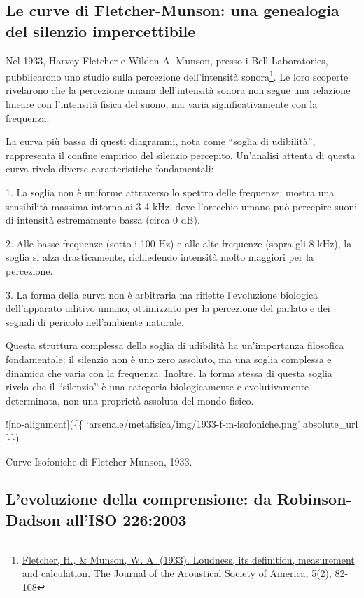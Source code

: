 \documentclass{gs-adonis}
\begin{document}
\subsection{Le curve di Fletcher-Munson: una genealogia del silenzio
impercettibile}\label{le-curve-di-fletcher-munson-una-genealogia-del-silenzio-impercettibile}

Nel 1933, Harvey Fletcher e Wilden A. Munson, presso i Bell
Laboratories, pubblicarono uno studio sulla percezione dell'intensità
sonora\footnote{\href{https://doi.org/10.1121/1.1915893}{Fletcher, H.,
  \& Munson, W. A. (1933). Loudness, its definition, measurement and
  calculation. The Journal of the Acoustical Society of America, 5(2),
  82-108}}. Le loro scoperte rivelarono che la percezione umana
dell'intensità sonora non segue una relazione lineare con l'intensità
fisica del suono, ma varia significativamente con la frequenza.

La curva più bassa di questi diagrammi, nota come ``soglia di
udibilità'', rappresenta il confine empirico del silenzio percepito.
Un'analisi attenta di questa curva rivela diverse caratteristiche
fondamentali:

1. La soglia non è uniforme attraverso lo spettro delle frequenze:
mostra una sensibilità massima intorno ai 3-4 kHz, dove l'orecchio umano
può percepire suoni di intensità estremamente bassa (circa 0 dB).

2. Alle basse frequenze (sotto i 100 Hz) e alle alte frequenze (sopra
gli 8 kHz), la soglia si alza drasticamente, richiedendo intensità molto
maggiori per la percezione.

3. La forma della curva non è arbitraria ma riflette l'evoluzione
biologica dell'apparato uditivo umano, ottimizzato per la percezione del
parlato e dei segnali di pericolo nell'ambiente naturale.

Questa struttura complessa della soglia di udibilità ha un'importanza
filosofica fondamentale: il silenzio non è uno zero assoluto, ma una
soglia complessa e dinamica che varia con la frequenza. Inoltre, la
forma stessa di questa soglia rivela che il ``silenzio'' è una categoria
biologicamente e evolutivamente determinata, non una proprietà assoluta
del mondo fisico.

!{[}no-alignment{]}(\{\{
`arsenale/metafisica/img/1933-f-m-isofoniche.png' \textbar{}
absolute\_url \}\})

Curve Isofoniche di Fletcher-Munson, 1933.

\subsection{L'evoluzione della comprensione: da Robinson-Dadson all'ISO
226:2003}\label{levoluzione-della-comprensione-da-robinson-dadson-alliso-2262003}
\end{document}
